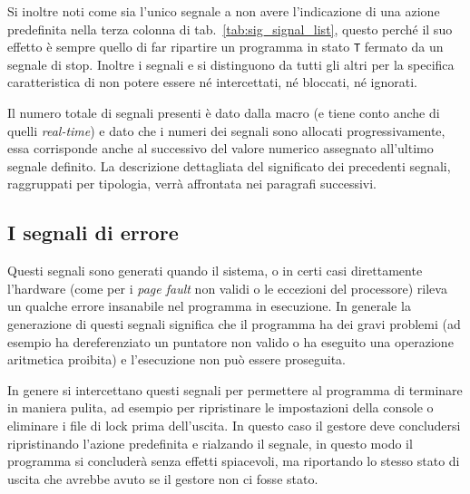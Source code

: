 Si inoltre noti come  sia l'unico segnale a non avere
l'indicazione di una azione predefinita nella terza colonna di
tab.~\ref{tab:sig_signal_list}, questo perché il suo effetto è sempre quello
di far ripartire un programma in stato \texttt{T} fermato da un segnale di
stop. Inoltre i segnali  e  si distinguono da
tutti gli altri per la specifica caratteristica di non potere essere né
intercettati, né bloccati, né ignorati.

Il numero totale di segnali presenti è dato dalla macro  (e tiene
conto anche di quelli \textit{real-time}) e dato che i numeri dei segnali sono
allocati progressivamente, essa corrisponde anche al successivo del valore
numerico assegnato all'ultimo segnale definito.  La descrizione dettagliata
del significato dei precedenti segnali, raggruppati per tipologia, verrà
affrontata nei paragrafi successivi.


\subsection{I segnali di errore}
\label{sec:sig_prog_error}

Questi segnali sono generati quando il sistema, o in certi casi direttamente
l'hardware (come per i \textit{page fault} non validi o le eccezioni del
processore) rileva un qualche errore insanabile nel programma in
esecuzione. In generale la generazione di questi segnali significa che il
programma ha dei gravi problemi (ad esempio ha dereferenziato un puntatore non
valido o ha eseguito una operazione aritmetica proibita) e l'esecuzione non
può essere proseguita.

In genere si intercettano questi segnali per permettere al programma di
terminare in maniera pulita, ad esempio per ripristinare le impostazioni della
console o eliminare i file di lock prima dell'uscita.  In questo caso il
gestore deve concludersi ripristinando l'azione predefinita e rialzando il
segnale, in questo modo il programma si concluderà senza effetti spiacevoli,
ma riportando lo stesso stato di uscita che avrebbe avuto se il gestore non ci
fosse stato.

